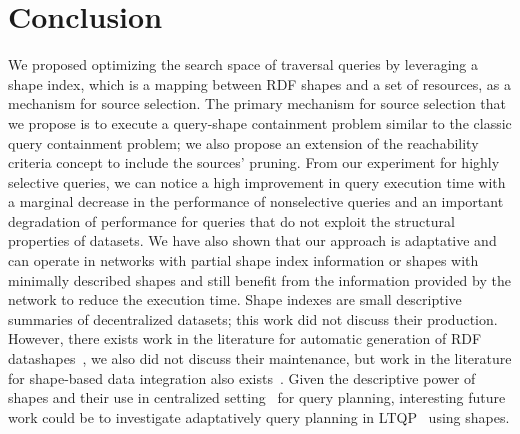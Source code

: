 \section{Conclusion}

We proposed optimizing the search space of traversal queries by leveraging a shape index, which is a mapping between RDF shapes and a set of resources, as a mechanism for source selection.
The primary mechanism for source selection that we propose is to execute a query-shape containment problem similar to the classic query containment problem; we also 
propose an extension of the reachability criteria concept to include the sources' pruning.
From our experiment for highly selective queries, we can notice a high improvement in query execution time with a marginal decrease in the performance of nonselective queries 
and an important degradation of performance for queries that do not exploit the structural properties of datasets.
We have also shown that our approach is adaptative and can operate in networks with partial shape index information or shapes with minimally described shapes and still benefit
from the information provided by the network to reduce the execution time.
Shape indexes are small descriptive summaries of decentralized datasets; this work did not discuss their production. However,
there exists work in the literature for automatic generation of RDF datashapes~\cite{fernandez2023extracting}, we also 
did not discuss their maintenance, but work in the literature for shape-based data integration also exists~\cite{LabraGayo2023}.
Given the descriptive power of shapes and their use in centralized setting~\cite{kashif2021} for query planning, interesting future work could be to investigate adaptatively
query planning in LTQP~\cite{taelman2024towards} using shapes.   